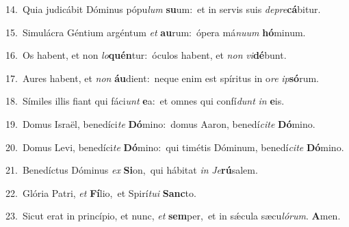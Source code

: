 {\numbfont\textcolor{\numbcolor}{14.}}~Quia judicábit Dóminus pópu\textit{lum} \textbf{su}\-um:~\star et in servis suis \textit{de}\-\textit{pre}\textbf{cá}bitur.\par
{\numbfont\textcolor{\numbcolor}{15.}}~Simulácra Géntium argéntum \textit{et} \textbf{au}\-rum:~\star ópera má\-\textit{nu}\-\textit{um} \textbf{hó}\-minum.\par
{\numbfont\textcolor{\numbcolor}{16.}}~Os habent, et non \textit{lo}\-\textbf{quén}tur:~\star óculos habent, et \textit{non} \textit{vi}\-\textbf{dé}bunt.\par
{\numbfont\textcolor{\numbcolor}{17.}}~Aures habent, et \textit{non} \textbf{áu}\-dient:~\star neque enim est spíritus in o\textit{re} \textit{ip}\-\textbf{só}rum.\par
{\numbfont\textcolor{\numbcolor}{18.}}~Símiles illis fiant qui fáci\textit{unt} \textbf{e}\-a:~\star et omnes qui confí\textit{dunt} \textit{in} \textbf{e}\-is.\par
{\numbfont\textcolor{\numbcolor}{19.}}~Domus Israël, benedíci\textit{te} \textbf{Dó}\-mino:~\star domus Aaron, benedí\-\textit{ci}\-\textit{te} \textbf{Dó}\-mino.\par
{\numbfont\textcolor{\numbcolor}{20.}}~Domus Levi, benedíci\textit{te} \textbf{Dó}\-mino:~\star qui timétis Dóminum, benedí\-\textit{ci}\-\textit{te} \textbf{Dó}\-mino.\par
{\numbfont\textcolor{\numbcolor}{21.}}~Benedíctus Dóminus \textit{ex} \textbf{Si}\-on,~\star qui hábitat \textit{in} \textit{Je}\-\textbf{rú}salem.\par
{\numbfont\textcolor{\numbcolor}{22.}}~Glória Patri, \textit{et} \textbf{Fí}\-lio,~\star et Spirí\-\textit{tu}\-\textit{i} \textbf{Sanc}\-to.\par
{\numbfont\textcolor{\numbcolor}{23.}}~Sicut erat in princípio, et nunc, \textit{et} \textbf{sem}\-per,~\star et in sǽcula sæcu\-\textit{ló}\-\textit{rum}. \textbf{A}\-men.\par
